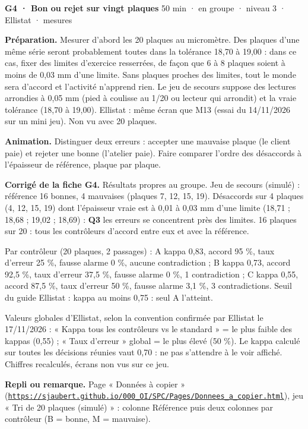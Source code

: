 \vspace{3pt}
\begin{tcolorbox}[act]\textbf{G4 · Bon ou rejet sur vingt plaques} \hfill {\small 50 min · en groupe · niveau 3 · Ellistat · mesures}\end{tcolorbox}
\textbf{Préparation.} Mesurer d'abord les 20 plaques au micromètre. Des plaques d'une même série seront probablement toutes dans la tolérance 18,70 à 19,00 : dans ce cas, fixer des limites d'exercice resserrées, de façon que 6 à 8 plaques soient à moins de 0,03 mm d'une limite. Sans plaques proches des limites, tout le monde sera d'accord et l'activité n'apprend rien. Le jeu de secours suppose des lectures arrondies à 0,05 mm (pied à coulisse au 1/20 ou lecteur qui arrondit) et la vraie tolérance (18,70 à 19,00). Ellistat : même écran que M13 (essai du 14/11/2026 sur un mini jeu). Non vu avec 20 plaques.\par
\textbf{Animation.} Distinguer deux erreurs : accepter une mauvaise plaque (le client paie) et rejeter une bonne (l'atelier paie). Faire comparer l'ordre des désaccords à l'épaisseur de référence, plaque par plaque.\par
\textbf{\color{ok}Corrigé de la fiche G4.} Résultats propres au groupe. Jeu de secours (simulé) : référence 16 bonnes, 4 mauvaises (plaques 7, 12, 15, 19). Désaccords sur 4 plaques (4, 12, 15, 19) dont l'épaisseur vraie est à 0,01 à 0,03 mm d'une limite (18,71 ; 18,68 ; 19,02 ; 18,69) : \textbf{Q3} les erreurs se concentrent près des limites. 16 plaques sur 20 : tous les contrôleurs d'accord entre eux et avec la référence.\par Par contrôleur (20 plaques, 2 passages) : A kappa 0,83, accord 95 \%, taux d'erreur 25 \%, fausse alarme 0 \%, aucune contradiction ; B kappa 0,73, accord 92,5 \%, taux d'erreur 37,5 \%, fausse alarme 0 \%, 1 contradiction ; C kappa 0,55, accord 87,5 \%, taux d'erreur 50 \%, fausse alarme 3,1 \%, 3 contradictions. Seuil du guide Ellistat : kappa au moins 0,75 : seul A l'atteint.\par Valeurs globales d'Ellistat, selon la convention confirmée par Ellistat le 17/11/2026 : « Kappa tous les contrôleurs vs le standard » = le plus faible des kappas (0,55) ; « Taux d'erreur » global = le plus élevé (50 \%). Le kappa calculé sur toutes les décisions réunies vaut 0,70 : ne pas s'attendre à le voir affiché. Chiffres recalculés, écrans non vus sur ce jeu.\par
{\small\textbf{Repli ou remarque.} Page « Données à copier » (\href{https://sjaubert.github.io/000_OI/SPC/Pages/Donnees_a_copier.html}{\nolinkurl{https://sjaubert.github.io/000_OI/SPC/Pages/Donnees_a_copier.html}}), jeu « Tri de 20 plaques (simulé) » : colonne Référence puis deux colonnes par contrôleur (B = bonne, M = mauvaise).}\par
